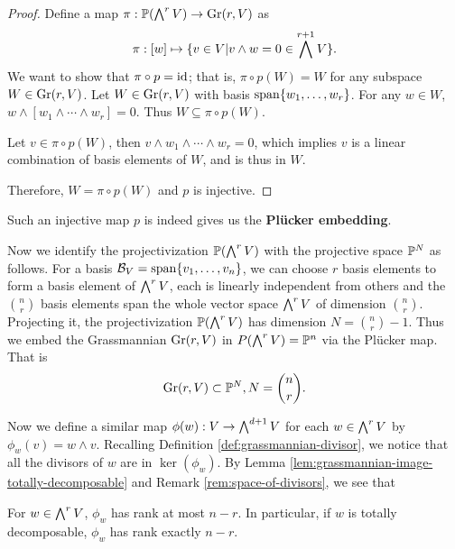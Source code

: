             \begin{proof}
                Define a map $\pi: \P(\bw^r V) \rightarrow \gr(r, V)$ as 
                \[
                \pi: [w] \mapsto \{v \in V| v \wedge w = 0 \in \bw^{r + 1} V\}.
                \]
                We want to show that $\pi \circ p = \id$;
                that is, $\pi \circ p(W) = W$ for any subspace $W \in \gr(r, V)$.
                Let $W \in \gr(r, V)$ with basis $\vecspan{w_1, \ldots, w_r}$.
                For any $w \in W$,
                $w \wedge [w_1 \wedge \cdots \wedge w_r] = 0$. 
                Thus $W \subseteq \pi \circ p(W)$.
                
                Let $v \in \pi \circ p(W)$, 
                then $v \wedge w_1 \wedge \cdots \wedge w_r = 0$,
                which implies $v$ is a linear combination of basis elements of $W$,
                and is thus in $W$. 
                
                Therefore, $W = \pi \circ p(W)$ 
                and $p$ is injective. 
            \end{proof}
            Such an injective map $p$ is indeed gives us the \textbf{Pl\"{u}cker embedding}.
            
            Now we identify the projectivization $\P(\bw^r V)$ with the projective space $\P^N$ as follows.
            For a basis $\calb_V = \vecspan{v_1, \ldots, v_n}$,
            we can choose $r$ basis elements to form a basis element of $\bw^r V$,
            each is linearly independent from others and the $\binom{n}{r}$ basis elements span the whole vector space $\bw^r V$ of dimension $\binom{n}{r}$.
            Projecting it, the projectivization $\P(\bw^r V)$ has dimension $N = \binom{n}{r} - 1$. 
            Thus we embed the Grassmannian $\gr(r, V)$ in $P(\bw^r V) = \P^n$ via the Pl\"{u}cker map. 
            That is 
            \[
            \gr(r, V) \subset \P^N, N = \binom{n}{r}.
            \]
            
            Now we define a similar map $\phi(w): V \rightarrow \bw^{d+1} V$ 
            for each $w \in \bw^r V$
            by $\phi_w(v) = w \wedge v$.
            Recalling Definition \ref{def:grassmannian-divisor}, 
            we notice that all the divisors of $w$ are in $\ker(\phi_w)$. 
            By Lemma \ref{lem:grassmannian-image-totally-decomposable}
            and Remark \ref{rem:space-of-divisors},
            we see that 
            \begin{corollary}
            \label{cor:rank-of-pi}
                For $w \in \bw^r V$, 
                $\phi_w$ has rank at most $n - r$.
                In particular, if $w$ is totally decomposable, $\phi_w$ has rank exactly $n-r$. 
            \end{corollary}
            

